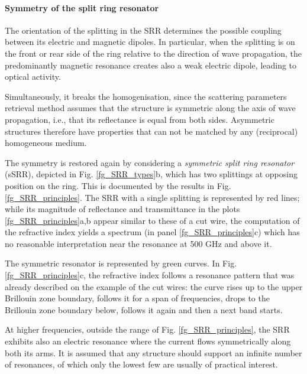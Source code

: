 \paragraph{Symmetry of the split ring resonator}%
The orientation of the splitting in the SRR determines the possible coupling between its electric and magnetic dipoles. In particular, when the splitting is on the front or rear side of the ring relative to the  direction of wave propagation, the predominantly magnetic resonance creates also a weak electric dipole, leading to optical activity. %

Simultaneously, it breaks the homogenisation, since the scattering parameters retrieval method assumes that the structure is symmetric along the axis of wave propagation, i.e., that its reflectance is equal from both sides. Asymmetric structures therefore have properties that can not be matched by any (reciprocal) homogeneous medium. 

The symmetry is restored again by considering a \textit{symmetric split ring resonator} (sSRR), depicted in Fig. \ref{fg_SRR_types}b, which has two splittings at opposing position on the ring. 
This is documented by the results in Fig. \ref{fg_SRR_principles}. The SRR with a single splitting is represented by red lines; while its magnitude of reflectance and transmittance in the plots \ref{fg_SRR_principles}a,b appear similar to these of a cut wire, the computation of the refractive index yields a spectrum (in panel \ref{fg_SRR_principles}c) which has no reasonable interpretation near the resonance at 500 GHz and above it. 

The symmetric resonator is represented by green curves. In Fig. \ref{fg_SRR_principles}c, the refractive index follows a resonance pattern that was already described on the example of the cut wires: the curve rises up to the upper Brillouin zone boundary, follows it for a span of frequencies, drops to the Brillouin zone boundary below, follows it again and then a next band starts. 

At higher frequencies, outside the range of Fig. \ref{fg_SRR_principles}, the SRR exhibits also an electric resonance where the current flows symmetrically along both its arms. It is assumed that any structure should support an infinite number of resonances, of which only the lowest few are usually of practical interest.
